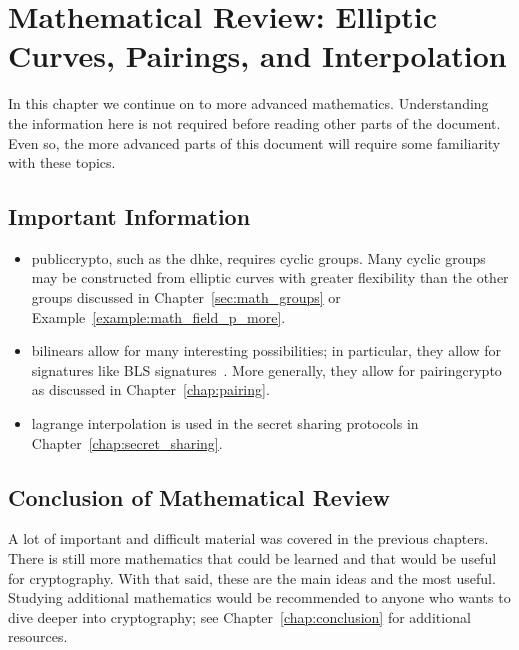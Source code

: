 \chapter{Mathematical Review: Elliptic Curves, Pairings, and Interpolation}
\label{chap:math_3}

In this chapter we continue on to more advanced mathematics.
Understanding the information here is not required before reading
other parts of the document.
Even so, the more advanced parts of this document will require some familiarity
with these topics.

\section{Important Information}

\begin{itemize}
\item \Gls{publiccrypto}, such as the \gls{dhke},
    requires \glspl{cyclic group}.
    Many \glspl{cyclic group} may be constructed from \glspl{elliptic curve}
    with greater flexibility than the other \glspl{group}
    discussed in Chapter~\ref{sec:math_groups}
    or Example~\ref{example:math_field_p_more}.
\item \Glspl{bilinear} allow for many interesting possibilities;
    in particular, they allow for \glspl{signature}
    like BLS signatures~\cite{BLSSignatures}.
    More generally, they allow for \Gls{pairingcrypto}
    as discussed in Chapter~\ref{chap:pairing}.
\item \Gls{lagrange interpolation} is used in the secret sharing protocols
    in Chapter~\ref{chap:secret_sharing}.
\end{itemize}





\section{Conclusion of Mathematical Review}

A lot of important and difficult material was covered
in the previous chapters.
There is still more mathematics that could be learned
and that would be useful for cryptography.
With that said, these are the main ideas and the most useful.
Studying additional mathematics would be recommended to anyone
who wants to dive deeper into cryptography;
see Chapter~\ref{chap:conclusion} for additional resources.
